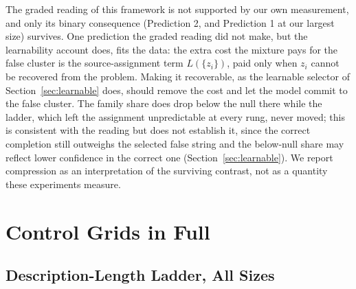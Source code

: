 \documentclass{article}
\begin{document}
The graded reading of this framework is not supported by our own measurement, and only its binary consequence (Prediction 2, and Prediction 1 at our largest size) survives. One prediction the graded reading did not make, but the learnability account does, fits the data: the extra cost the mixture pays for the false cluster is the source-assignment term $L(\{z_i\})$, paid only when $z_i$ cannot be recovered from the problem. Making it recoverable, as the learnable selector of Section~\ref{sec:learnable} does, should remove the cost and let the model commit to the false cluster. The family share does drop below the null there while the ladder, which left the assignment unpredictable at every rung, never moved; this is consistent with the reading but does not establish it, since the correct completion still outweighs the selected false string and the below-null share may reflect lower confidence in the correct one (Section~\ref{sec:learnable}). We report compression as an interpretation of the surviving contrast, not as a quantity these experiments measure.

\section{Control Grids in Full}
\label{app:controls}

\subsection{Description-Length Ladder, All Sizes}
\end{document}
